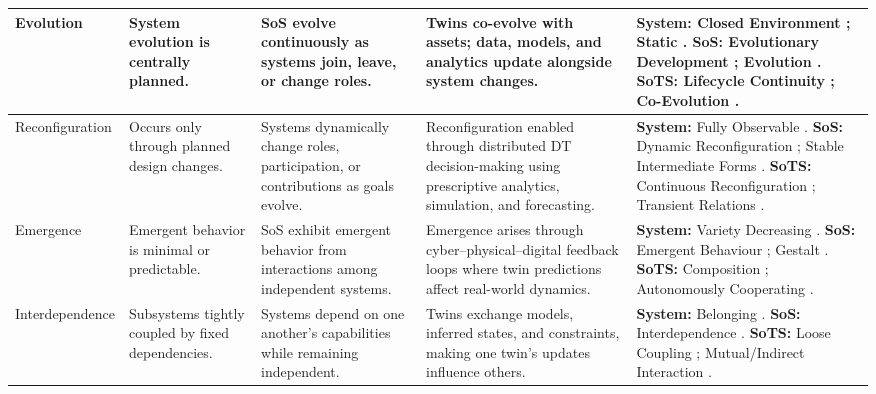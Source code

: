 \begin{table}[htbp]
\begin{adjustbox}{center}
\begin{tabularx}{1.15\textwidth}{
  >{\raggedright\arraybackslash}p{2.5cm}
  >{\raggedright\arraybackslash}p{3cm}
  >{\raggedright\arraybackslash}p{3cm}
  >{\raggedright\arraybackslash}p{3.7cm}
  >{\raggedright\arraybackslash}X }
\hline

Evolution &
System evolution is centrally planned. &
SoS evolve continuously as systems join, leave, or change roles. &
Twins co-evolve with assets; data, models, and analytics update alongside system changes. &
\textbf{System:} Closed Environment \cite{jackson1984towards}; Static \cite{ackoff1971towards}.\newline
\textbf{SoS:} Evolutionary Development \cite{maier1998architecting}; Evolution \cite{nielsen2015systems}.\newline
\textbf{SoTS:} Lifecycle Continuity \cite{michael2022integration}; Co-Evolution \cite{olsson2023systems}. \\

\hline

Reconfiguration &
Occurs only through planned design changes. &
Systems dynamically change roles, participation, or contributions as goals evolve. &
Reconfiguration enabled through distributed DT decision-making using prescriptive analytics, simulation, and forecasting. &
\textbf{System:} Fully Observable \cite{jackson1984towards}.\newline
\textbf{SoS:} Dynamic Reconfiguration \cite{boardman2006system}; Stable Intermediate Forms \cite{maier1998architecting}.\newline
\textbf{SoTS:} Continuous Reconfiguration \cite{gill2024toward}; Transient Relations \cite{dietz2020digital}. \\

\hline

Emergence &
Emergent behavior is minimal or predictable. &
SoS exhibit emergent behavior from interactions among independent systems. &
Emergence arises through cyber–physical–digital feedback loops where twin predictions affect real-world dynamics. &
\textbf{System:} Variety Decreasing \cite{ackoff1971towards}.\newline
\textbf{SoS:} Emergent Behaviour \cite{maier1998architecting}; Gestalt \cite{boulding1956general}.\newline
\textbf{SoTS:} Composition \cite{gill2024toward}; Autonomously Cooperating \cite{dietz2020digital}. \\

\hline

Interdependence &
Subsystems tightly coupled by fixed dependencies. &
Systems depend on one another’s capabilities while remaining independent. &
Twins exchange models, inferred states, and constraints, making one twin’s updates influence others. &
\textbf{System:} Belonging \cite{boardman2006system}.\newline
\textbf{SoS:} Interdependence \cite{nielsen2015systems}.\newline
\textbf{SoTS:} Loose Coupling \cite{borth2019digital}; Mutual/Indirect Interaction \cite{esterle2021digital}. \\


\end{tabularx}
\end{adjustbox}
\end{table}
